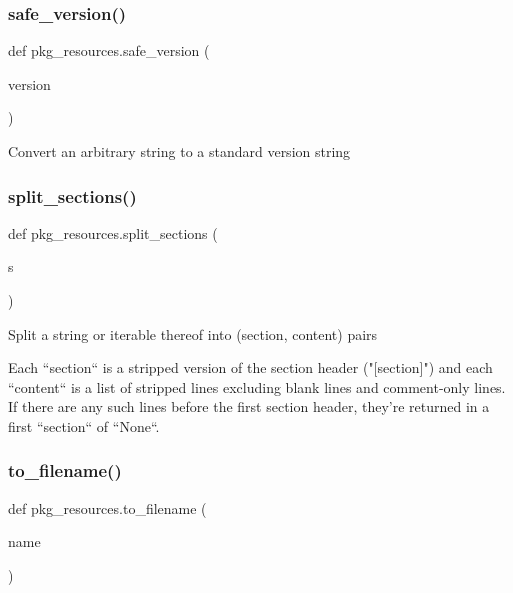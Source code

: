 \subsubsection{\texorpdfstring{safe\+\_\+version()}{safe\_version()}}
{\footnotesize\ttfamily def pkg\+\_\+resources.\+safe\+\_\+version (\begin{DoxyParamCaption}\item[{}]{version }\end{DoxyParamCaption})}

\begin{DoxyVerb}Convert an arbitrary string to a standard version string
\end{DoxyVerb}
 \mbox{\label{namespacepkg__resources_ac538bbed636a0b964382693ba2a06742}} 
\subsubsection{\texorpdfstring{split\+\_\+sections()}{split\_sections()}}
{\footnotesize\ttfamily def pkg\+\_\+resources.\+split\+\_\+sections (\begin{DoxyParamCaption}\item[{}]{s }\end{DoxyParamCaption})}

\begin{DoxyVerb}Split a string or iterable thereof into (section, content) pairs

Each ``section`` is a stripped version of the section header ("[section]")
and each ``content`` is a list of stripped lines excluding blank lines and
comment-only lines.  If there are any such lines before the first section
header, they're returned in a first ``section`` of ``None``.
\end{DoxyVerb}
 \mbox{\label{namespacepkg__resources_a6c980c35b437e195d4ab09e4fac70626}} 
\subsubsection{\texorpdfstring{to\+\_\+filename()}{to\_filename()}}
{\footnotesize\ttfamily def pkg\+\_\+resources.\+to\+\_\+filename (\begin{DoxyParamCaption}\item[{}]{name }\end{DoxyParamCaption})}


